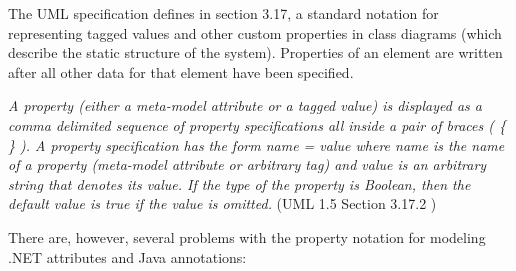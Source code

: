 The UML specification \cite{www.uml} defines in section 3.17, a standard notation for representing tagged values and other custom properties in class diagrams (which describe the static structure of the system). Properties of an element are written after all other data for that element have been specified.

\begin{dinglist}{43}
\item \textit{A property (either a meta-model attribute or a tagged value) is
    displayed as a comma delimited sequence of property specifications all
    inside a pair of braces ( \{ \} ). A property specification has the form
    name = value where name is the name of a property (meta-model attribute or
    arbitrary tag) and value is an arbitrary string that denotes its value. If
    the type of the property is Boolean, then the default value is true if the
    value is omitted.} (UML 1.5 Section 3.17.2 \cite{www.uml})
\end{dinglist}

\noindent There are, however, several problems with the property notation for modeling .NET attributes and Java annotations:

